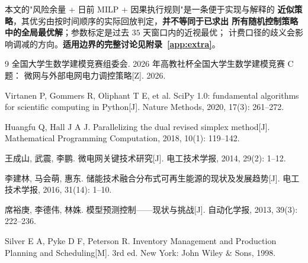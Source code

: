 \documentclass[withoutpreface,bwprint]{cumcmthesis}
\begin{document}
本文的"风险余量 + 日前 MILP + 因果执行规则"是一条便于实现与解释的
\textbf{近似策略}，其优劣由按时间顺序的实际回放判定，\textbf{并不等同于已求出
所有随机控制策略中的全局最优解}；参数标定是过去 $35$ 天窗口内的近视最优；
计费口径的歧义会影响调减的方向。\textbf{适用边界的完整讨论见附录~\ref{app:extra}}。






\label{tmp:bib}
\begin{thebibliography}{9}
  \footnotesize
  \setlength{\itemsep}{0pt}
  \setlength{\parsep}{0pt}
  全国大学生数学建模竞赛组委会. 2026 年高教社杯全国大学生数学建模竞赛 C 题：
  微网与外部电网电力调控策略[Z]. 2026.

  Virtanen P, Gommers R, Oliphant T E, et al. SciPy 1.0: fundamental algorithms
  for scientific computing in Python[J]. Nature Methods, 2020, 17(3): 261--272.

  Huangfu Q, Hall J A J. Parallelizing the dual revised simplex method[J].
  Mathematical Programming Computation, 2018, 10(1): 119--142.

  王成山, 武震, 李鹏. 微电网关键技术研究[J]. 电工技术学报, 2014, 29(2): 1--12.

  李建林, 马会萌, 惠东. 储能技术融合分布式可再生能源的现状及发展趋势[J].
  电工技术学报, 2016, 31(14): 1--10.

  席裕庚, 李德伟, 林姝. 模型预测控制——现状与挑战[J]. 自动化学报, 2013,
  39(3): 222--236.

  Silver E A, Pyke D F, Peterson R. Inventory Management and Production
  Planning and Scheduling[M]. 3rd ed. New York: John Wiley \& Sons, 1998.
\end{thebibliography}
\end{document}
